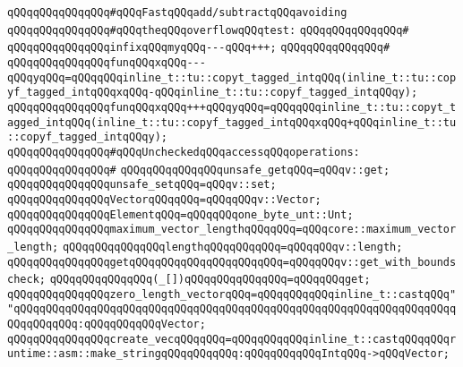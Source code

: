 \newline
\verb|qQQqqQQqqQQqqQQq#qQQqFastqQQqadd/subtractqQQqavoiding|\newline
\verb|qQQqqQQqqQQqqQQq#qQQqtheqQQqoverflowqQQqtest:|\newline
\verb|qQQqqQQqqQQqqQQq#|\newline
\verb|qQQqqQQqqQQqqQQqinfixqQQqmyqQQq---qQQq+++;|\newline
\verb|qQQqqQQqqQQqqQQq#|\newline
\verb|qQQqqQQqqQQqqQQqfunqQQqxqQQq---qQQqyqQQq=qQQqqQQqinline_t::tu::copyt_tagged_intqQQq(inline_t::tu::copyf_tagged_intqQQqxqQQq-qQQqinline_t::tu::copyf_tagged_intqQQqy);|\newline
\verb|qQQqqQQqqQQqqQQqfunqQQqxqQQq+++qQQqyqQQq=qQQqqQQqinline_t::tu::copyt_tagged_intqQQq(inline_t::tu::copyf_tagged_intqQQqxqQQq+qQQqinline_t::tu::copyf_tagged_intqQQqy);|\newline
\newline
\verb|qQQqqQQqqQQqqQQq#qQQqUncheckedqQQqaccessqQQqoperations:|\newline
\verb|qQQqqQQqqQQqqQQq#|\newline
\verb|qQQqqQQqqQQqqQQqunsafe_getqQQq=qQQqv::get;|\newline
\verb|qQQqqQQqqQQqqQQqunsafe_setqQQq=qQQqv::set;|\newline
\newline
\verb|qQQqqQQqqQQqqQQqVectorqQQqqQQq=qQQqqQQqv::Vector;|\newline
\verb|qQQqqQQqqQQqqQQqElementqQQq=qQQqqQQqone_byte_unt::Unt;|\newline
\newline
\verb|qQQqqQQqqQQqqQQqmaximum_vector_lengthqQQqqQQq=qQQqcore::maximum_vector_length;|\newline
\newline
\verb|qQQqqQQqqQQqqQQqlengthqQQqqQQqqQQq=qQQqqQQqv::length;|\newline
\verb|qQQqqQQqqQQqqQQqgetqQQqqQQqqQQqqQQqqQQqqQQq=qQQqqQQqv::get_with_boundscheck;|\newline
\verb|qQQqqQQqqQQqqQQq(_[])qQQqqQQqqQQqqQQq=qQQqqQQqget;|\newline
\newline
\verb|qQQqqQQqqQQqqQQqzero_length_vectorqQQq=qQQqqQQqqQQqinline_t::castqQQq""qQQqqQQqqQQqqQQqqQQqqQQqqQQqqQQqqQQqqQQqqQQqqQQqqQQqqQQqqQQqqQQqqQQqqQQqqQQqqQQq:qQQqqQQqqQQqVector;|\newline
\newline
\verb|qQQqqQQqqQQqqQQqcreate_vecqQQqqQQq=qQQqqQQqqQQqinline_t::castqQQqqQQqruntime::asm::make_stringqQQqqQQqqQQq:qQQqqQQqqQQqIntqQQq->qQQqVector;|\newline
